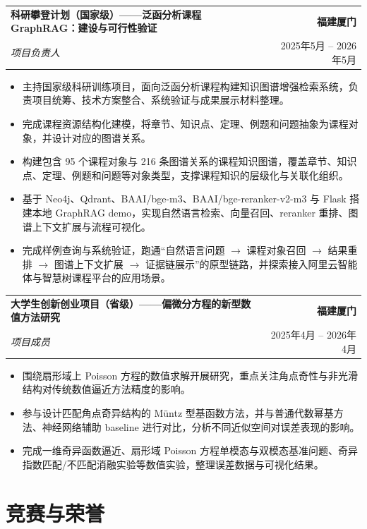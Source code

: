 \documentclass[letterpaper,11pt]{ctexart}
\makeatletter
\newcommand{\resumeProject}[4]{
    \vspace{3pt}
    \noindent
    \begin{tabular*}{\textwidth}{l@{\extracolsep{\fill}}r}
        \textbf{#1} & \textbf{#2} \\
        \textit{\textcolor{textgray}{#3}} & \textcolor{textgray}{#4} \\
    \end{tabular*}
    \vspace{-3pt}
}
\makeatother
\begin{document}
\resumeProject
{科研攀登计划（国家级）——泛函分析课程 GraphRAG：建设与可行性验证}
{福建厦门}
{项目负责人}
{2025年5月 -- 2026年5月}
\begin{itemize}
  \item 主持国家级科研训练项目，面向泛函分析课程构建知识图谱增强检索系统，负责项目统筹、技术方案整合、系统验证与成果展示材料整理。
  \item 完成课程资源结构化建模，将章节、知识点、定理、例题和问题抽象为课程对象，并设计对应的图谱关系。
  \item 构建包含 95 个课程对象与 216 条图谱关系的课程知识图谱，覆盖章节、知识点、定理、例题和问题等对象类型，支撑课程知识的层级化与关联化组织。
  \item 基于 Neo4j、Qdrant、BAAI/bge-m3、BAAI/bge-reranker-v2-m3 与 Flask 搭建本地 GraphRAG demo，实现自然语言检索、向量召回、reranker 重排、图谱上下文扩展与流程可视化。
  \item 完成样例查询与系统验证，跑通“自然语言问题 $\rightarrow$ 课程对象召回 $\rightarrow$ 结果重排 $\rightarrow$ 图谱上下文扩展 $\rightarrow$ 证据链展示”的原型链路，并探索接入阿里云智能体与智慧树课程平台的应用场景。
\end{itemize}

\vspace{2pt}

\resumeProject
{大学生创新创业项目（省级）——偏微分方程的新型数值方法研究}
{福建厦门}
{项目成员}
{2025年4月 -- 2026年4月}
\begin{itemize}
  \item 围绕扇形域上 Poisson 方程的数值求解开展研究，重点关注角点奇性与非光滑结构对传统数值逼近方法精度的影响。
  \item 参与设计匹配角点奇异结构的 Müntz 型基函数方法，并与普通代数幂基方法、神经网络辅助 baseline 进行对比，分析不同近似空间对误差表现的影响。
  \item 完成一维奇异函数逼近、扇形域 Poisson 方程单模态与双模态基准问题、奇异指数匹配/不匹配消融实验等数值实验，整理误差数据与可视化结果。
\end{itemize}



\vspace{2pt}

\section{竞赛与荣誉}
\end{document}
